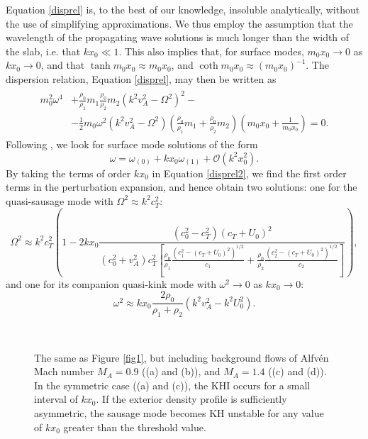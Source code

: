 Equation \eqref{disprel} is, to the best of our knowledge, insoluble analytically, without the use of simplifying approximations. We thus employ the assumption that the wavelength of the propagating wave solutions is much longer than the width of the slab, i.e. that $k x_0 \ll 1$. This also implies that, for surface modes, $m_0 x_0 \to 0$ as $k x_0 \to 0$, and that $\tanh m_0 x_0 \approx m_0 x_0$, and $\coth m_0 x_0 \approx (m_0 x_0)^{-1}$. The dispersion relation, Equation \eqref{disprel}, may then be written as
\begin{align}
\label{disprel2}
\begin{split}
m_0^2 \omega^4 & + \frac{\rho_0}{\rho_1} m_1 \frac{\rho_0}{\rho_2} m_2 ( k^2 v_A^2 - \Omega^2 )^2 - \\
& - \frac{1}{2} m_0 \omega^2 ( k^2 v_A^2 - \Omega^2) \left ( \frac{\rho_0}{\rho_1} m_1 + \frac{\rho_0}{\rho_2} m_2 \right ) \left ( m_0 x_0 + \frac{1}{m_0 x_0} \right ) = 0.
\end{split}
\end{align}
Following \cite{Roberts1981b}, we look for surface mode solutions of the form
\[\omega = \omega_{(0)} + k x_0 \omega_{(1)} + \mathcal{O}(k^2 x_0^2). \]
By taking the terms of order $k x_0$ in Equation \eqref{disprel2}, we find the first order terms in the perturbation expansion, and hence obtain two solutions: one for the quasi-sausage mode with $\Omega^2 \approx k^2 c_T^2$:
\begin{equation}
\label{sol1}
\Omega^2 \approx k^2 c_T^2 \left( 1 - 2 k x_0 \frac{(c_0^2 - c_T^2) (c_T + U_0)^2}{ (c_0^2 + v_A^2) c_T^2 \left [ \frac{\rho_0}{\rho_1} \frac{(c_1^2 - (c_T + U_0)^2)^{1/2}}{c_1} + \frac{\rho_0}{\rho_2} \frac{(c_2^2 - (c_T + U_0)^2)^{1/2}}{c_2} \right ]} \right), 
\end{equation}
and one for its companion quasi-kink mode with $\omega^2 \to 0$ as $k x_0 \to 0$:
\begin{equation}
\label{sol2}
\omega^2 \approx k x_0 \frac{2 \rho_0}{\rho_1 + \rho_2} (k^2 v_A^2 - k^2 U_0^2). 
\end{equation}
\begin{figure}[ht]
\centering
{}
\hspace{3pt}
\\
\hspace{3pt}
\caption{The same as Figure \ref{fig1}, but including background flows of Alfv\'en Mach number $M_A = 0.9$ ((a) and (b)), and $M_A = 1.4$ ((c) and (d)). In the symmetric case ((a) and (c)), the KHI occurs for a small interval of $k x_0$. If the exterior density profile is sufficiently asymmetric, the sausage mode becomes KH unstable for any value of $k x_0$ greater than the threshold value.}
\label{fig3}
\end{figure}
